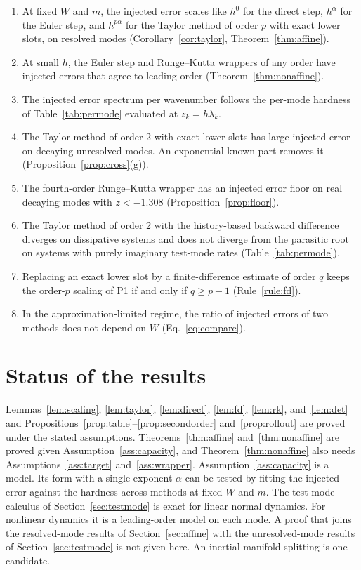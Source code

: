 \documentclass[11pt]{article}
\theoremstyle{definition}
\theoremstyle{remark}
\begin{document}
\begin{enumerate}[label=P\arabic*.]
\item At fixed $W$ and $m$, the injected error scales like $h^0$ for the direct step, $h^{\alpha}$ for the Euler step, and $h^{p\alpha}$ for the Taylor method of order $p$ with exact lower slots, on resolved modes (Corollary~\ref{cor:taylor}, Theorem~\ref{thm:affine}).
\item At small $h$, the Euler step and Runge--Kutta wrappers of any order have injected errors that agree to leading order (Theorem~\ref{thm:nonaffine}).
\item The injected error spectrum per wavenumber follows the per-mode hardness of Table~\ref{tab:permode} evaluated at $z_k = h\lambda_k$.
\item The Taylor method of order 2 with exact lower slots has large injected error on decaying unresolved modes. An exponential known part removes it (Proposition~\ref{prop:cross}(g)).
\item The fourth-order Runge--Kutta wrapper has an injected error floor on real decaying modes with $z < -1.308$ (Proposition~\ref{prop:floor}).
\item The Taylor method of order 2 with the history-based backward difference diverges on dissipative systems and does not diverge from the parasitic root on systems with purely imaginary test-mode rates (Table~\ref{tab:permode}).
\item Replacing an exact lower slot by a finite-difference estimate of order $q$ keeps the order-$p$ scaling of P1 if and only if $q \ge p-1$ (Rule~\ref{rule:fd}).
\item In the approximation-limited regime, the ratio of injected errors of two methods does not depend on $W$ (Eq.~\eqref{eq:compare}).
\end{enumerate}

\section{Status of the results}\label{sec:status}

Lemmas~\ref{lem:scaling}, \ref{lem:taylor}, \ref{lem:direct}, \ref{lem:fd}, \ref{lem:rk}, and~\ref{lem:det} and Propositions~\ref{prop:table}--\ref{prop:secondorder} and~\ref{prop:rollout} are proved under the stated assumptions.
Theorems~\ref{thm:affine} and~\ref{thm:nonaffine} are proved given Assumption~\ref{ass:capacity}, and Theorem~\ref{thm:nonaffine} also needs Assumptions~\ref{ass:target} and~\ref{ass:wrapper}.
Assumption~\ref{ass:capacity} is a model.
Its form with a single exponent $\alpha$ can be tested by fitting the injected error against the hardness across methods at fixed $W$ and $m$.
The test-mode calculus of Section~\ref{sec:testmode} is exact for linear normal dynamics.
For nonlinear dynamics it is a leading-order model on each mode.
A proof that joins the resolved-mode results of Section~\ref{sec:affine} with the unresolved-mode results of Section~\ref{sec:testmode} is not given here.
An inertial-manifold splitting is one candidate.
\end{document}
